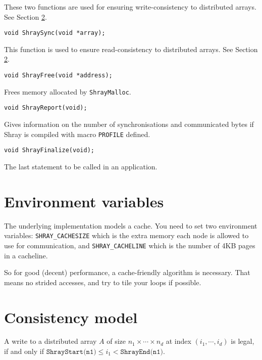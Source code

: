 \documentclass{article}
\begin{document}
These two functions are used for ensuring write-consistency to distributed arrays. See 
Section \ref{consistency}.

\begin{lstlisting}
void ShraySync(void *array);
\end{lstlisting}

This function is used to ensure read-consistency to distributed arrays. See Section 
\ref{consistency}.

\begin{lstlisting}
void ShrayFree(void *address);
\end{lstlisting}

Frees memory allocated by \texttt{ShrayMalloc}.

\begin{lstlisting}
void ShrayReport(void);
\end{lstlisting}

Gives information on the number of synchronisations and communicated bytes if Shray is compiled
with macro \texttt{PROFILE} defined.

\begin{lstlisting}
void ShrayFinalize(void);
\end{lstlisting}

The last statement to be called in an application.

\section{Environment variables}

The underlying implementation models a cache. You need to set two environment variables:
\texttt{SHRAY_CACHESIZE} which is the extra memory each node is allowed to use for 
communication, and \texttt{SHRAY_CACHELINE} which is the number of 4KB pages in a cacheline. 



So for good (decent) performance, a cache-friendly 
algorithm is necessary. That means no strided accesses, and try to tile your loops if possible. 

\section{Consistency model}\label{consistency}

A write to a distributed array $A$ of size $n_1 \times \cdots \times n_d$ at index 
$(i_1, \cdots, i_d)$ is legal, if and only if 
$\texttt{ShrayStart(n1)} \leq i_1 < \texttt{ShrayEnd(n1)}$.
\end{document}
